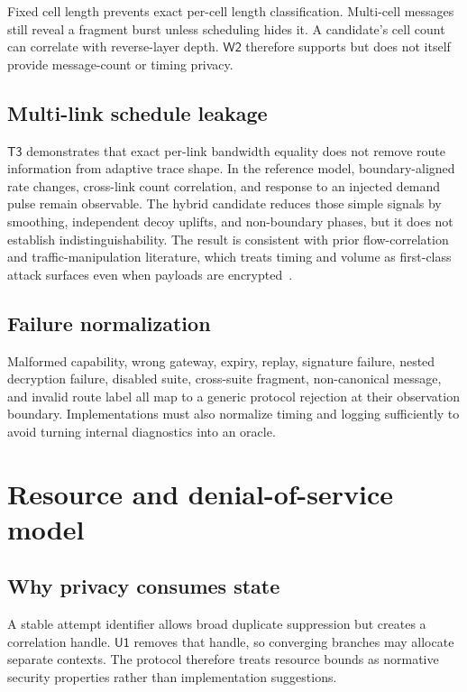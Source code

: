 \documentclass[11pt,oneside]{article}
\newcommand{\Uone}{\ensuremath{\mathsf{U1}}}
\newcommand{\Wtwo}{\ensuremath{\mathsf{W2}}}
\newcommand{\Tthree}{\ensuremath{\mathsf{T3}}}
\begin{document}
Fixed cell length prevents exact per-cell length classification. Multi-cell messages still reveal a fragment burst unless scheduling hides it. A candidate's cell count can correlate with reverse-layer depth. \Wtwo{} therefore supports but does not itself provide message-count or timing privacy.


\subsection{Multi-link schedule leakage}

\Tthree{} demonstrates that exact per-link bandwidth equality does not remove route information from adaptive trace shape. In the reference model, boundary-aligned rate changes, cross-link count correlation, and response to an injected demand pulse remain observable. The hybrid candidate reduces those simple signals by smoothing, independent decoy uplifts, and non-boundary phases, but it does not establish indistinguishability. The result is consistent with prior flow-correlation and traffic-manipulation literature, which treats timing and volume as first-class attack surfaces even when payloads are encrypted~\cite{deepcorr,dropmark,duster,raptor}.

\subsection{Failure normalization}

Malformed capability, wrong gateway, expiry, replay, signature failure, nested decryption failure, disabled suite, cross-suite fragment, non-canonical message, and invalid route label all map to a generic protocol rejection at their observation boundary. Implementations must also normalize timing and logging sufficiently to avoid turning internal diagnostics into an oracle.

\section{Resource and denial-of-service model}
\label{sec:resources}

\subsection{Why privacy consumes state}

A stable attempt identifier allows broad duplicate suppression but creates a correlation handle. \Uone{} removes that handle, so converging branches may allocate separate contexts. The protocol therefore treats resource bounds as normative security properties rather than implementation suggestions.
\end{document}
